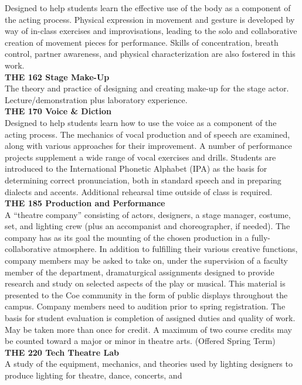 \documentclass[
  letterpaper,
]{scrbook}
\begin{document}
Designed to help students learn the effective use of the body as a
component of the acting process. Physical expression in movement and
gesture is developed by way of in-class exercises and improvisations,
leading to the solo and collaborative creation of movement pieces for
performance. Skills of concentration, breath control, partner awareness,
and physical characterization are also fostered in this work.\\
\textbf{THE 162 Stage Make-Up}\\
The theory and practice of designing and creating make-up for the stage
actor. Lecture/demonstration plus laboratory experience.\\
\textbf{THE 170 Voice \& Diction}\\
Designed to help students learn how to use the voice as a component of
the acting process. The mechanics of vocal production and of speech are
examined, along with various approaches for their improvement. A number
of performance projects supplement a wide range of vocal exercises and
drills. Students are introduced to the International Phonetic Alphabet
(IPA) as the basis for determining correct pronunciation, both in
standard speech and in preparing dialects and accents. Additional
rehearsal time outside of class is required.\\
\textbf{THE 185 Production and Performance}\\
A ``theatre company'' consisting of actors, designers, a stage manager,
costume, set, and lighting crew (plus an accompanist and choreographer,
if needed). The company has as its goal the mounting of the chosen
production in a fully-collaborative atmosphere. In addition to
fulfilling their various creative functions, company members may be
asked to take on, under the supervision of a faculty member of the
department, dramaturgical assignments designed to provide research and
study on selected aspects of the play or musical. This material is
presented to the Coe community in the form of public displays throughout
the campus. Company members need to audition prior to spring
registration. The basis for student evaluation is completion of assigned
duties and quality of work. May be taken more than once for credit. A
maximum of two course credits may be counted toward a major or minor in
theatre arts. (Offered Spring Term)\\
\textbf{THE 220 Tech Theatre Lab}\\
A study of the equipment, mechanics, and theories used by lighting
designers to produce lighting for theatre, dance, concerts, and
\end{document}
